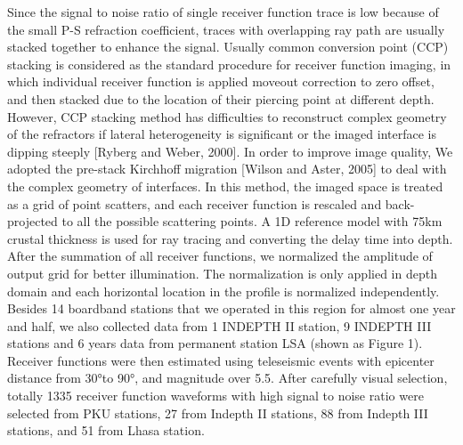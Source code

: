

Since the signal to noise ratio of single receiver function trace is low because of the small P-S refraction coefficient, traces with overlapping ray path are usually stacked together to enhance the signal. Usually common conversion point (CCP) stacking is considered as the standard procedure for receiver function imaging, in which individual receiver function is applied moveout correction to zero offset, and then stacked due to the location of their piercing point at different depth. However, CCP stacking method has difficulties to reconstruct complex geometry of the refractors if lateral heterogeneity is significant or the imaged interface is dipping steeply [Ryberg and Weber, 2000]. In order to improve image quality, We adopted the pre-stack Kirchhoff migration [Wilson and Aster, 2005] to deal with the complex geometry of interfaces. In this method, the imaged space is treated as a grid of point scatters, and each receiver function is rescaled and back-projected to all the possible scattering points. A 1D reference model with 75km crustal thickness is used for ray tracing and converting the delay time into depth. After the summation of all receiver functions, we normalized the amplitude of output grid for better illumination. The normalization is only applied in depth domain and each horizontal location in the profile is normalized independently. 
Besides 14 boardband stations that we operated in this region for almost one year and half, we also collected data from 1 INDEPTH II station, 9 INDEPTH III stations and 6 years data from permanent station LSA (shown as Figure 1). Receiver functions were then estimated using teleseismic events with epicenter distance from 30°to 90°, and magnitude over 5.5. After carefully visual selection, totally 1335 receiver function waveforms with high signal to noise ratio were selected from PKU stations, 27 from Indepth II stations, 88 from Indepth III stations, and 51 from Lhasa station.
